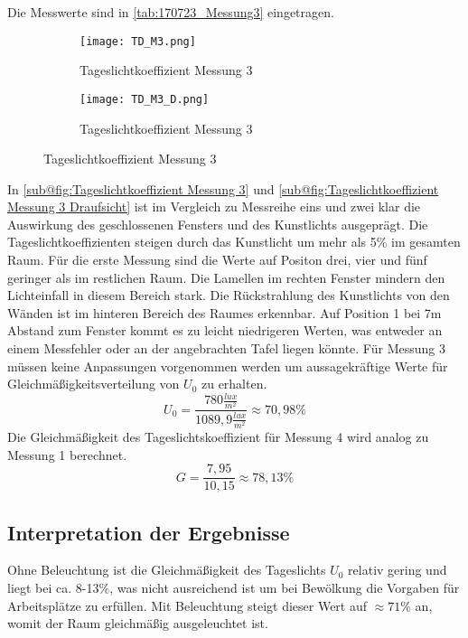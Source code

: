     Die Messwerte sind in \autoref{tab:170723_Messung3} eingetragen.
  \begin{figure}[H]
  \centering
  \begin{subfigure}[c]{0.5\textwidth}
      \texttt{[image: TD\_M3.png]}
      \caption{Tageslichtkoeffizient Messung 3}
      \label{fig:Tageslichtkoeffizient Messung 3}
  \end{subfigure}
  \hfill
  \begin{subfigure}[c]{0.45\textwidth}
      \texttt{[image: TD\_M3\_D.png]}
      \caption{Tageslichtkoeffizient Messung 3}
      \label{fig:Tageslichtkoeffizient Messung 3 Draufsicht}
  \end{subfigure}
  \label{fig:Messung 3 Tageslichtkoeffizient}
  \end{figure}
  In \autoref{sub@fig:Tageslichtkoeffizient Messung 3} und \autoref{sub@fig:Tageslichtkoeffizient Messung 3 Draufsicht} ist im Vergleich zu Messreihe eins und zwei klar die Auswirkung des geschlossenen Fensters und des Kunstlichts ausgeprägt.
  Die Tageslichtkoeffizienten steigen durch das Kunstlicht um mehr als 5\% im gesamten Raum.  Für die erste Messung sind die Werte auf Positon drei, vier und fünf geringer als im restlichen Raum. Die Lamellen im rechten Fenster mindern den Lichteinfall in diesem Bereich stark. Die Rückstrahlung des Kunstlichts von den Wänden ist im hinteren Bereich des Raumes erkennbar. Auf Position 1 bei 7m Abstand zum Fenster kommt es zu leicht niedrigeren Werten, was entweder an einem Messfehler oder an der angebrachten Tafel liegen könnte.
Für Messung 3 müssen keine Anpassungen vorgenommen werden um aussagekräftige Werte für Gleichmäßigkeitsverteilung von $U_0$ zu erhalten.
  $$U_0 = \frac{780\frac{lux}{m^2}}{1089,9\frac{lux}{m^2}}\approx 70,98\%$$
  Die Gleichmäßigkeit des Tageslichtskoeffizient für Messung 4 wird analog zu Messung 1 berechnet.
  $$G = \frac{7,95}{10,15}\approx 78,13\%$$
\newpage
\subsection{Interpretation der Ergebnisse}
Ohne Beleuchtung ist die Gleichmäßigkeit des Tageslichts $U_{0}$ relativ gering und liegt bei ca. 8-13\%, was nicht ausreichend ist um bei Bewölkung die Vorgaben für Arbeitsplätze zu erfüllen.
Mit Beleuchtung steigt dieser Wert auf $\approx 71\%$ an, womit der Raum gleichmäßig ausgeleuchtet ist.

